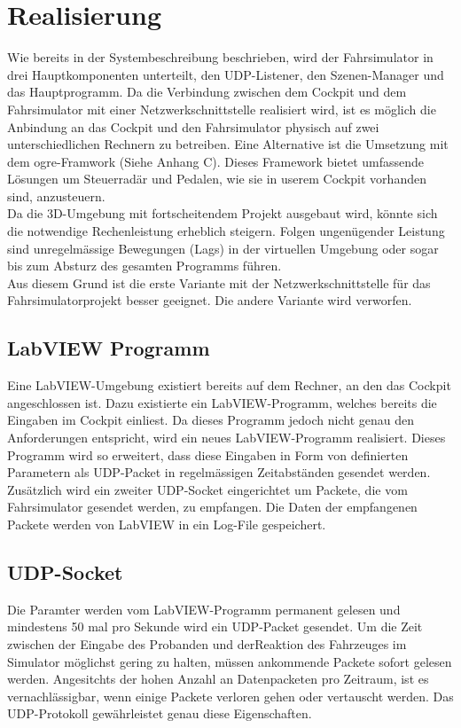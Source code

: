 \section{Realisierung}
Wie bereits in der Systembeschreibung beschrieben, wird der Fahrsimulator in drei Hauptkomponenten unterteilt, den UDP-Listener, den Szenen-Manager und das Hauptprogramm. Da die Verbindung zwischen dem Cockpit und dem Fahrsimulator mit einer Netzwerkschnittstelle realisiert wird, ist es möglich die Anbindung an das Cockpit und den Fahrsimulator physisch auf zwei unterschiedlichen Rechnern zu betreiben. Eine Alternative ist die Umsetzung mit dem \gls{ogre}-Framwork (Siehe Anhang C). Dieses Framework bietet umfassende Lösungen um Steuerradär und Pedalen, wie sie in userem Cockpit vorhanden sind, anzusteuern.\\
Da die 3D-Umgebung mit fortscheitendem Projekt ausgebaut wird, könnte sich die notwendige Rechenleistung erheblich steigern. Folgen ungenügender Leistung sind unregelmässige Bewegungen (Lags) in der virtuellen Umgebung oder sogar bis zum Absturz des gesamten Programms führen.\\
Aus diesem Grund ist die erste Variante mit der Netzwerkschnittstelle für das Fahrsimulatorprojekt besser geeignet. Die andere Variante wird verworfen.
\subsection{LabVIEW Programm}
Eine LabVIEW-Umgebung existiert bereits auf dem Rechner, an den das Cockpit angeschlossen ist. Dazu existierte ein LabVIEW-Programm, welches bereits die Eingaben im Cockpit einliest. Da dieses Programm jedoch nicht genau den Anforderungen entspricht, wird ein neues LabVIEW-Programm realisiert. Dieses Programm wird so erweitert, dass diese Eingaben in Form von definierten Parametern als UDP-Packet in regelmässigen Zeitabständen gesendet werden. Zusätzlich wird ein zweiter UDP-Socket eingerichtet um Packete, die vom Fahrsimulator gesendet werden, zu empfangen. Die Daten der empfangenen Packete werden von LabVIEW in ein Log-File gespeichert.
\subsection{UDP-Socket}
Die Paramter werden vom LabVIEW-Programm permanent gelesen und mindestens 50 mal pro Sekunde wird ein UDP-Packet gesendet. Um die Zeit zwischen der Eingabe des Probanden und derReaktion des Fahrzeuges im Simulator möglichst gering zu halten, müssen ankommende Packete sofort gelesen werden. Angesitchts der hohen Anzahl an Datenpacketen pro Zeitraum, ist es vernachlässigbar, wenn einige Packete verloren gehen oder vertauscht werden. Das UDP-Protokoll gewährleistet genau diese Eigenschaften.

